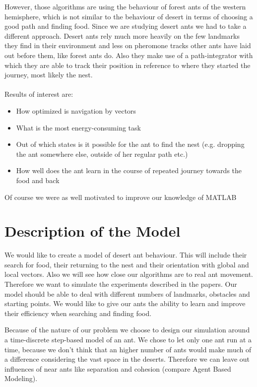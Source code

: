 \documentclass[11pt]{article}
\begin{document}
However, those algorithms are using the behaviour of forest ants of the western hemisphere, which is not similar to the behaviour of desert in terms of choosing a good path and finding food. Since we are studying desert ants we had to take a different approach. Desert ants rely much more heavily on the few landmarks they find in their environment and less on pheromone tracks other ants have laid out before them, like forest ants do. Also they make use of a path-integrator with which they are able to track their position in reference to where they started the journey, most likely the nest.\\\\
Results of interest are:
\begin{itemize}
\item How optimized is navigation by vectors 
\item What is the most energy-consuming task
\item Out of which states is it possible for the ant to find the nest (e.g. dropping the ant somewhere else, outside of her regular path etc.)
\item How well does the ant learn in the course of repeated journey towards the food and back
\end{itemize}

Of course we were as well motivated to improve our knowledge of MATLAB\texttrademark

\newpage

\section{Description of the Model}
We would like to create a model of desert ant behaviour. This will include their search for food, their returning to the nest and their orientation with global and local vectors. Also we will see how close our algorithms are to real ant movement. Therefore we want to simulate the experiments described in the papers. Our model should be able to deal with different numbers of landmarks, obstacles and starting points. We would like to give our ants the ability to learn and improve their efficiency when searching and finding food.

Because of the nature of our problem we choose to design our simulation around a time-discrete step-based model of an ant. We chose to let only one ant run at a time, because we don’t think that an higher number of ants would make much of a difference considering the vast space in the deserts. Therefore we can leave out influences of near ants like separation and cohesion (compare Agent Based Modeling).
\end{document}

